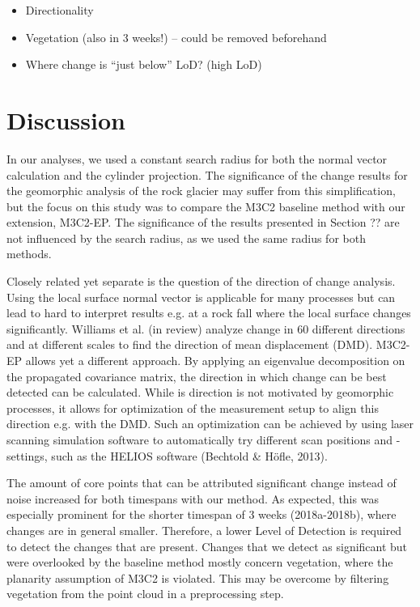 \documentclass[preprint,12pt,3p]{elsarticle}
\begin{document}
 \begin{itemize}
    \item Directionality
    \item Vegetation (also in 3 weeks!) – could be removed beforehand
    \item Where change is “just below” LoD? (high LoD)
 \end{itemize}

\section{Discussion}
In our analyses, we used a constant search radius for both the normal vector calculation and the cylinder projection. The significance of the change results for the geomorphic analysis of the rock glacier may suffer from this simplification, but the focus on this study was to compare the M3C2 baseline method with our extension, M3C2-EP. The significance of the results presented in Section ?? are not influenced by the search radius, as we used the same radius for both methods. 

Closely related yet separate is the question of the direction of change analysis. Using the local surface normal vector is applicable for many processes but can lead to hard to interpret results e.g. at a rock fall where the local surface changes significantly. Williams et al. (in review) analyze change in 60 different directions and at different scales to find the direction of mean displacement (DMD). M3C2-EP allows yet a different approach. By applying an eigenvalue decomposition on the propagated covariance matrix, the direction in which change can be best detected can be calculated. While is direction is not motivated by geomorphic processes, it allows for optimization of the measurement setup to align this direction e.g. with the DMD. Such an optimization can be achieved by using laser scanning simulation software to automatically try different scan positions and -settings, such as the HELIOS software (Bechtold \& Höfle, 2013).

The amount of core points that can be attributed significant change instead of noise increased for both timespans with our method. As expected, this was especially prominent for the shorter timespan of 3 weeks (2018a-2018b), where changes are in general smaller. Therefore, a lower Level of Detection is required to detect the changes that are present. 
Changes that we detect as significant but were overlooked by the baseline method mostly concern vegetation, where the planarity assumption of M3C2 is violated. This may be overcome by filtering vegetation from the point cloud in a preprocessing step.
\end{document}
